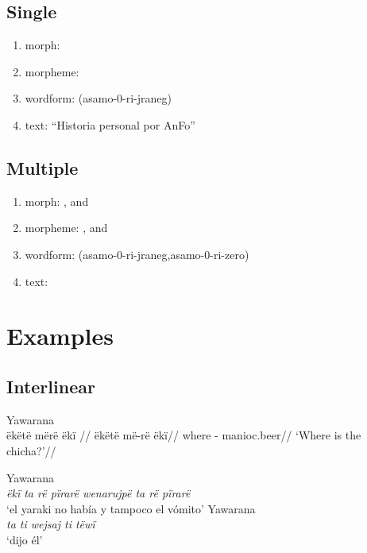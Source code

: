 \documentclass{memoir}
\begin{document}
\subsection{Single}

\begin{enumerate}
\def\labelenumi{\arabic{enumi}.}
\tightlist
\item
  morph: 
\item
  morpheme: 
\item
  wordform: (asamo-0-ri-jraneg)
\item
  text: ``Historia personal por AnFo''
\end{enumerate}

\subsection{Multiple}

\begin{enumerate}
\def\labelenumi{\arabic{enumi}.}
\tightlist
\item
  morph: , and 
\item
  morpheme: , and 
\item
  wordform: (asamo-0-ri-jraneg,asamo-0-ri-zero)
\item
  text:
\end{enumerate}

\section{Examples}

\subsection{Interlinear}

\ex Yawarana \\
\label{ctorat-34}    \begingl
    \glpreamble  ëkëtë mërë ëkï //
    \gla ëkëtë më-rë ëkï//
    \glb where - manioc.beer//
        \glft ‘Where is the chicha?’//  
    \endgl 
\xe

\pex\label{}    \a Yawarana\\
    \label{ctorat-35}        \textit{ëkï ta rë pïrarë wenarujpë ta rë pïrarë }\\
            ‘el yaraki no había y tampoco el vómito’     \a Yawarana\\
    \label{ctorat-36}        \textit{ta ti wejsaj ti tëwï }\\
            ‘dijo él’ \xe
\end{document}

